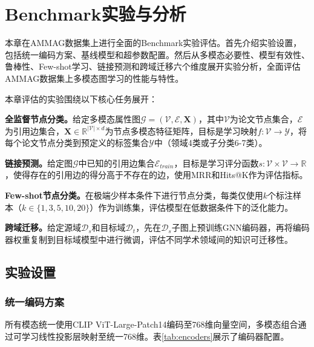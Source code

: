 
\chapter{Benchmark实验与分析}

本章在AMMAG数据集上进行全面的Benchmark实验评估。首先介绍实验设置，包括统一编码方案、基线模型和超参数配置。然后从多模态必要性、模型有效性、鲁棒性、Few-shot学习、链接预测和跨域迁移六个维度展开实验分析，全面评估AMMAG数据集上多模态图学习的性能与特性。

本章评估的实验围绕以下核心任务展开：

\textbf{全监督节点分类。}给定多模态属性图$\mathcal{G}=(\mathcal{V}, \mathcal{E}, \mathbf{X})$，其中$\mathcal{V}$为论文节点集合，$\mathcal{E}$为引用边集合，$\mathbf{X} \in \mathbb{R}^{|\mathcal{V}| \times d}$为节点多模态特征矩阵，目标是学习映射$f: \mathcal{V} \rightarrow \mathcal{Y}$，将每个论文节点分类到预定义的标签集合$\mathcal{Y}$中（领域4类或子分类6-7类）。

\textbf{链接预测。}给定图$\mathcal{G}$中已知的引用边集合$\mathcal{E}_{train}$，目标是学习评分函数$s: \mathcal{V} \times \mathcal{V} \rightarrow \mathbb{R}$，使得存在的引用边的得分高于不存在的边，使用MRR和Hits@K作为评估指标。

\textbf{Few-shot节点分类。}在极端少样本条件下进行节点分类，每类仅使用$k$个标注样本（$k \in \{1, 3, 5, 10, 20\}$）作为训练集，评估模型在低数据条件下的泛化能力。

\textbf{跨域迁移。}给定源域$\mathcal{D}_s$和目标域$\mathcal{D}_t$，先在$\mathcal{D}_s$子图上预训练GNN编码器，再将编码器权重复制到目标域模型中进行微调，评估不同学术领域间的知识可迁移性。

\section{实验设置}

\subsection{统一编码方案}

所有模态统一使用CLIP\cite{radford2021clip} ViT-Large-Patch14编码至768维向量空间，多模态组合通过可学习线性投影层映射至统一768维。表\ref{tab:encoders}展示了编码器配置。

